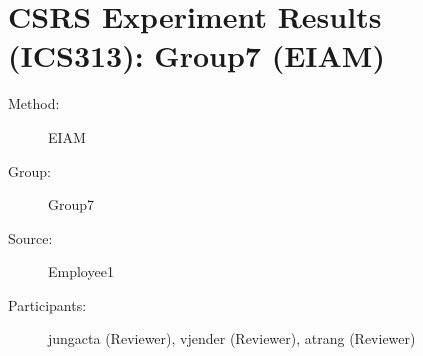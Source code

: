 
%          
\chapter {CSRS Experiment Results (ICS313): Group7 (EIAM)}
\small
	  

\begin{description}
\item [Method:] EIAM
\item [Group:] Group7
\item [Source:] Employee1
\item [Participants:] jungacta (Reviewer), vjender (Reviewer), atrang (Reviewer)
\end{description}
